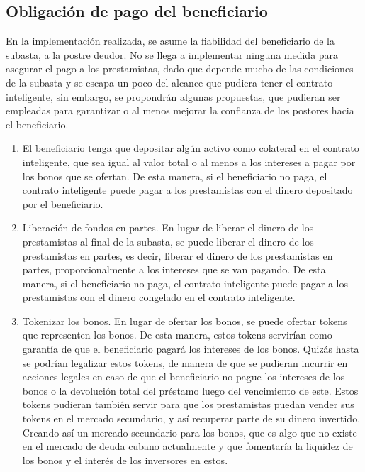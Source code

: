     \subsection{Obligación de pago del beneficiario}
      En la implementación realizada, se asume la fiabilidad del beneficiario de la subasta, a la postre deudor. No se llega a implementar
      ninguna medida para asegurar el pago a los prestamistas, dado que depende mucho de las condiciones de la subasta y se escapa un poco
      del alcance que pudiera tener el contrato inteligente, sin embargo, se 
      propondrán algunas propuestas, que pudieran ser empleadas para garantizar o al menos mejorar la confianza de los postores hacia
      el beneficiario.

      \begin{enumerate}
        \item El beneficiario tenga que depositar algún activo como colateral en el contrato inteligente, que sea igual al valor total o al menos
        a los intereses a pagar por los bonos que
        se ofertan. De esta manera, si el beneficiario no paga, el contrato inteligente puede pagar a los prestamistas con el dinero
        depositado por el beneficiario.
        \item Liberación de fondos en partes. En lugar de liberar el dinero de los prestamistas al final de la subasta, se puede liberar el 
        dinero de los prestamistas en partes, es decir, liberar el dinero de los prestamistas en partes, proporcionalmente a los intereses 
        que se
        van pagando. De esta manera, si el beneficiario no paga, el contrato inteligente puede pagar a los prestamistas con el dinero
        congelado en el contrato inteligente.
        \item Tokenizar los bonos. En lugar de ofertar los bonos, se puede ofertar tokens que representen los bonos. De esta manera, estos
        tokens servirían como garantía de que el beneficiario pagará los intereses de los bonos. Quizás hasta se podrían legalizar estos
        tokens, de manera de que se pudieran incurrir en acciones legales en caso de que el beneficiario no pague los intereses de los
        bonos o la devolución total  del préstamo luego del vencimiento de este. Estos tokens pudieran también servir para que los prestamistas
        puedan vender sus tokens en el mercado secundario, y así recuperar parte de su dinero invertido. Creando así un mercado secundario
        para los bonos, que es algo que no existe en el mercado de deuda cubano actualmente y que fomentaría la liquidez de los bonos y el
        interés de los inversores en estos.
      \end{enumerate}

